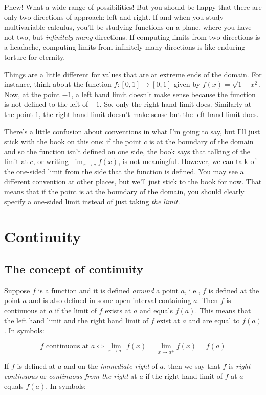 \documentclass[10pt]{amsart}
\begin{document}
Phew! What a wide range of possibilities! But you should be happy that
there are only two directions of approach: left and right. If and when
you study multivariable calculus, you'll be studying functions on a
plane, where you have not two, but {\em infinitely many}
directions. If computing limits from two directions is a headache,
computing limits from infinitely many directions is like enduring
torture for eternity.

Things are a little different for values that are at extreme ends of
the domain. For instance, think about the function $f:[0,1] \to [0,1]$
given by $f(x) = \sqrt{1 - x^2}$. Now, at the point $-1$, a left hand
limit doesn't make sense because the function is not defined to the
left of $-1$. So, only the right hand limit does. Similarly at the
point $1$, the right hand limit doesn't make sense but the left hand
limit does.

There's a little confusion about conventions in what I'm going to say,
but I'll just stick with the book on this one: if the point $c$ is at
the boundary of the domain and so the function isn't defined on one
side, the book says that talking of the limit at $c$, or writing
$\lim_{x \to c} f(x)$, is not meaningful. However, we can talk of the
one-sided limit from the side that the function is defined. You may
see a different convention at other places, but we'll just stick to
the book for now. That means that if the point is at the boundary of
the domain, you should clearly specify a one-sided limit instead of
just taking {\em the limit}.

\section{Continuity}
\subsection{The concept of continuity}

Suppose $f$ is a function and it is defined {\em around} a point $a$,
i.e., $f$ is defined at the point $a$ and is also defined in some open
interval containing $a$. Then $f$ is continuous at $a$ if the limit of
$f$ exists at $a$ and equals $f(a)$. This means that the left hand
limit and the right hand limit of $f$ exist at $a$ and are equal to
$f(a)$. In symbols:

$$f \text{ continuous at } a \iff \lim_{x \to a^-} f(x) = \lim_{x \to
a^+} f(x) = f(a)$$

If $f$ is defined at $a$ and on the {\em immediate right} of $a$, then
we say that $f$ is {\em right continuous} or {\em continuous from the
right} at $a$ if the right hand limit of $f$ at $a$ equals $f(a)$. In
symbols:
\end{document}
